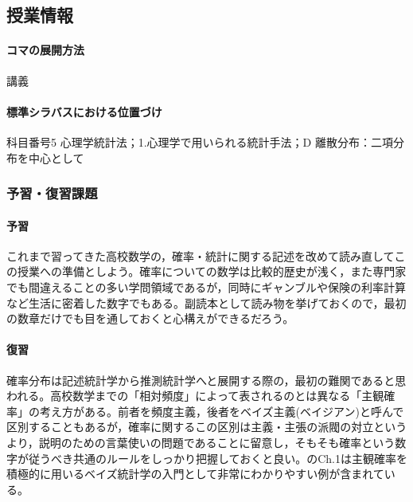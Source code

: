 \subsection{授業情報}
\paragraph{コマの展開方法}
講義
\paragraph{標準シラバスにおける位置づけ}
科目番号5 心理学統計法；1.心理学で用いられる統計手法；D 離散分布：二項分布を中心として
\subsubsection{予習・復習課題}
\paragraph{予習}
これまで習ってきた高校数学の，確率・統計に関する記述を改めて読み直してこの授業への準備としよう。確率についての数学は比較的歴史が浅く，また専門家でも間違えることの多い学問領域であるが，同時にギャンブルや保険の利率計算など生活に密着した数字でもある。副読本として読み物\citet{浜田201812}を挙げておくので，最初の数章だけでも目を通しておくと心構えができるだろう。
\paragraph{復習}
確率分布は記述統計学から推測統計学へと展開する際の，最初の難関であると思われる。高校数学までの「相対頻度」によって表されるのとは異なる「主観確率」の考え方がある。前者を頻度主義，後者をベイズ主義(ベイジアン)と呼んで区別することもあるが，確率に関するこの区別は主義・主張の派閥の対立というより，説明のための言葉使いの問題であることに留意し，そもそも確率という数字が従うべき共通のルールをしっかり把握しておくと良い。\citet{Maeda2017}のCh.1は主観確率を積極的に用いるベイズ統計学の入門として非常にわかりやすい例が含まれている。
